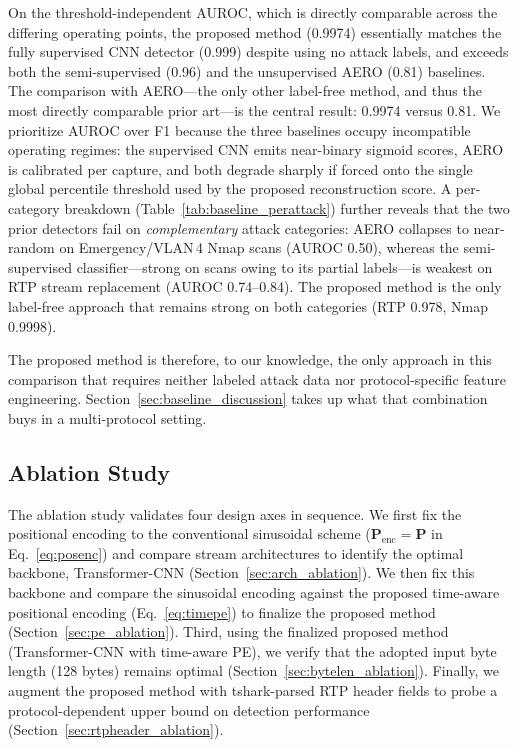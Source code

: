 On the threshold-independent AUROC, which is directly comparable across the differing operating points, the proposed method (0.9974) essentially matches the fully supervised CNN detector (0.999) despite using no attack labels, and exceeds both the semi-supervised (0.96) and the unsupervised AERO (0.81) baselines. The comparison with AERO---the only other label-free method, and thus the most directly comparable prior art---is the central result: 0.9974 versus 0.81. We prioritize AUROC over F1 because the three baselines occupy incompatible operating regimes: the supervised CNN emits near-binary sigmoid scores, AERO is calibrated per capture, and both degrade sharply if forced onto the single global percentile threshold used by the proposed reconstruction score. A per-category breakdown (Table~\ref{tab:baseline_perattack}) further reveals that the two prior detectors fail on \emph{complementary} attack categories: AERO collapses to near-random on Emergency/VLAN\,4 Nmap scans (AUROC 0.50), whereas the semi-supervised classifier---strong on scans owing to its partial labels---is weakest on RTP stream replacement (AUROC 0.74--0.84). The proposed method is the only label-free approach that remains strong on both categories (RTP 0.978, Nmap 0.9998).

The proposed method is therefore, to our knowledge, the only approach in this comparison that requires neither labeled attack data nor protocol-specific feature engineering. Section~\ref{sec:baseline_discussion} takes up what that combination buys in a multi-protocol setting.

\subsection{Ablation Study}
\label{sec:ablation}
The ablation study validates four design axes in sequence. We first fix the positional encoding to the conventional sinusoidal scheme ($\mathbf{P}_{\text{enc}} = \mathbf{P}$ in Eq.~\eqref{eq:posenc}) and compare stream architectures to identify the optimal backbone, Transformer-CNN (Section~\ref{sec:arch_ablation}). We then fix this backbone and compare the sinusoidal encoding against the proposed time-aware positional encoding (Eq.~\eqref{eq:timepe}) to finalize the proposed method (Section~\ref{sec:pe_ablation}). Third, using the finalized proposed method (Transformer-CNN with time-aware PE), we verify that the adopted input byte length (128 bytes) remains optimal (Section~\ref{sec:bytelen_ablation}). Finally, we augment the proposed method with tshark-parsed RTP header fields to probe a protocol-dependent upper bound on detection performance (Section~\ref{sec:rtpheader_ablation}).

